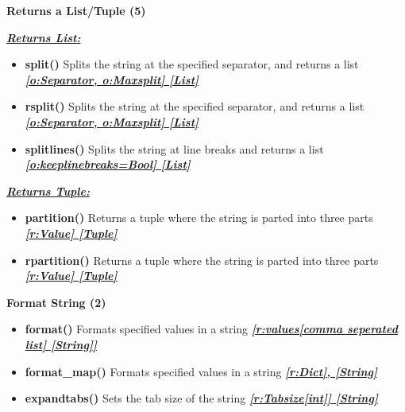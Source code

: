 \documentclass{report}
\begin{document}
    \bigbreak \noindent 
    
      \begin{center}
        \textbf{Returns a List/Tuple (5)}
      \end{center}
      \bigbreak \noindent 
      \textbf{\textit{\underline{Returns List:}}}
      \begin{itemize}
        \item[\ding{43}] \textbf{split()}	Splits the string at the specified separator, and returns a list
          \smallbreak
          \textbf{\textit{\underline{[o:Separator, o:Maxsplit] [List]}}}
          \smallbreak
        \item[\ding{43}] \textbf{rsplit()} Splits the string at the specified separator, and returns a list
          \smallbreak
          \textbf{\textit{\underline{[o:Separator, o:Maxsplit] [List]}}}
          \smallbreak
        \item[\ding{43}] \textbf{splitlines()}	Splits the string at line breaks and returns a list
          \smallbreak
          \textbf{\textit{\underline{[o:keeplinebreaks=Bool] [List]}}}
      \end{itemize}
      \bigbreak \noindent 
      \textbf{\textit{\underline{Returns Tuple:}}}
      \begin{itemize}
        \item[\ding{43}] \textbf{partition()}	Returns a tuple where the string is parted into three parts
          \smallbreak
          \textbf{\textit{\underline{[r:Value] [Tuple]}}}
          \smallbreak
        \item[\ding{43}] \textbf{rpartition()}	Returns a tuple where the string is parted into three parts
          \smallbreak
          \textbf{\textit{\underline{[r:Value] [Tuple]}}}
      \end{itemize}
    

    \bigbreak \noindent 
    
      \begin{center}
        \textbf{Format String (2)}
      \end{center}
      \begin{itemize}
        \item[\ding{43}] \textbf{format()}    Formats specified values in a string
          \smallbreak
          \textbf{\textit{\underline{[r:values[comma seperated list] [String]]}}}
          \smallbreak
        \item[\ding{43}] \textbf{format\_map()} Formats specified values in a string
          \smallbreak
          \textbf{\textit{\underline{[r:Dict], [String]}}}
          \smallbreak
        \item[\ding{43}] \textbf{expandtabs()}    Sets the tab size of the string
          \smallbreak
          \textbf{\textit{\underline{[r:Tabsize[int]] [String]}}}
      \end{itemize}
    
\end{document}
